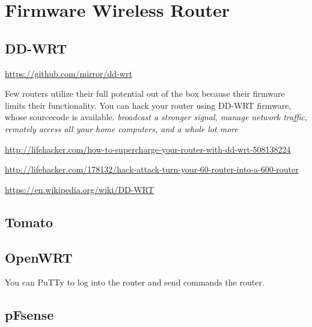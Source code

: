\chapter{Firmware Wireless Router}


\section{DD-WRT}
\label{sec:DD-WRT}

\url{https://github.com/mirror/dd-wrt}

Few routers utilize their full potential out of the box because their firmware
limits their functionality. You can hack your router using DD-WRT firmware,
whose sourcecode is available.
{\it broadcast a stronger signal, manage network traffic, remotely access all
your home computers, and a whole lot more}


\url{http://lifehacker.com/how-to-supercharge-your-router-with-dd-wrt-508138224}

\url{http://lifehacker.com/178132/hack-attack-turn-your-60-router-into-a-600-router}

\url{https://en.wikipedia.org/wiki/DD-WRT}


\section{Tomato }


\section{OpenWRT}

You can PuTTy to log into the router and send commands the router.


\section{pFsense}

